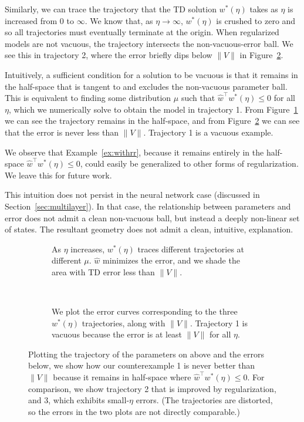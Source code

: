 Similarly, we can trace the trajectory that the TD solution $w^*(\eta)$ takes as $\eta$ is increased from 0 to $\infty$. We know that, as $\eta\to\infty$, $w^*(\eta)$ is crushed to zero and so all trajectories must eventually terminate at the origin. When regularized models are not vacuous, the trajectory intersects the non-vacuous-error ball. We see this in trajectory 2, where the error briefly dips below $\|V\|$ in Figure~\ref{fig:giplots}.

Intuitively, a sufficient condition for a solution to be vacuous is that it remains in the half-space that is tangent to and excludes the non-vacuous parameter ball. This is equivalent to finding some distribution $\mu$ such that $\hat w^\top w^*(\eta) \leq 0$ for all $\eta$, which we numerically solve to obtain the model in trajectory 1. From Figure~\ref{fig:gigeometry} we can see the trajectory remains in the half-space, and from Figure~\ref{fig:giplots} we can see that the error is never less than $\|V\|$. Trajectory 1 is a vacuous example.

We observe that Example~\ref*{ex:withrr}, because it remains entirely in the half-space $\hat w^\top w^*(\eta) \leq 0$, could easily be generalized to other forms of regularization. We leave this for future work.

This intuition does not persist in the neural network case (discussed in Section~\ref{sec:multilayer}). In that case, the relationship between parameters and error does not admit a clean non-vacuous ball, but instead a deeply non-linear set of states. The resultant geometry does not admit a clean, intuitive, explanation.

\begin{figure} \centering
	\begin{subfigure}[t]{0.8\textwidth}
		\centering
		
		\caption{As $\eta$ increases, $w^*(\eta)$ traces different trajectories at different $\mu$. $\hat w$ minimizes the error, and we shade the area with TD error less than $\|V\|$. }\label{fig:gigeometry}
	\end{subfigure}
	\\
	\begin{subfigure}[t]{0.8\textwidth}
		\centering
		
		\caption{We plot the error curves corresponding to the three $w^*(\eta)$ trajectories, along with $\|V\|$. Trajectory 1 is vacuous because the error is at least $\|V\|$ for all $\eta$. }\label{fig:giplots}
	\end{subfigure}
	\caption{Plotting the trajectory of the parameters on above and the errors below, we show how our counterexample 1 is never better than $\|V\|$ because it remains in half-space where $\hat w^\top w^*(\eta) \leq 0$. For comparison, we show trajectory 2 that is improved by regularization, and 3, which exhibits small-$\eta$ errors. (The trajectories are distorted, so the errors in the two plots are not directly comparable.) }
	\label{fig:gi}
\end{figure}

